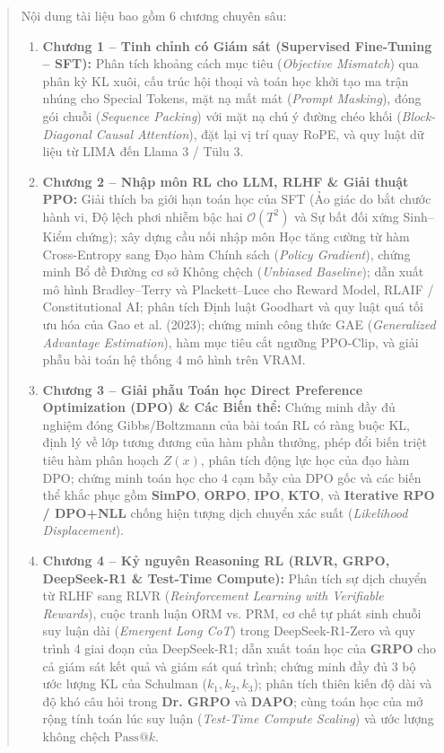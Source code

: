 \documentclass[11pt,a4paper,oneside]{report}
\theoremstyle{plain}
\theoremstyle{definition}
\theoremstyle{remark}
\begin{document}
\begin{abstract}
\vspace{0.3cm}
\noindent
Nội dung tài liệu bao gồm 6 chương chuyên sâu:
\begin{enumerate}[leftmargin=1.5cm]
    \item \textbf{Chương 1 -- Tinh chỉnh có Giám sát (Supervised Fine-Tuning -- SFT):} Phân tích khoảng cách mục tiêu (\textit{Objective Mismatch}) qua phân kỳ KL xuôi, cấu trúc hội thoại và toán học khởi tạo ma trận nhúng cho Special Tokens, mặt nạ mất mát (\textit{Prompt Masking}), đóng gói chuỗi (\textit{Sequence Packing}) với mặt nạ chú ý đường chéo khối (\textit{Block-Diagonal Causal Attention}), đặt lại vị trí quay RoPE, và quy luật dữ liệu từ LIMA đến Llama 3 / Tülu 3.
    \item \textbf{Chương 2 -- Nhập môn RL cho LLM, RLHF \& Giải thuật PPO:} Giải thích ba giới hạn toán học của SFT (Ảo giác do bắt chước hành vi, Độ lệch phơi nhiễm bậc hai $\mathcal{O}(T^2)$ và Sự bất đối xứng Sinh--Kiểm chứng); xây dựng cầu nối nhập môn Học tăng cường từ hàm Cross-Entropy sang Đạo hàm Chính sách (\textit{Policy Gradient}), chứng minh Bổ đề Đường cơ sở Không chệch (\textit{Unbiased Baseline}); dẫn xuất mô hình Bradley--Terry và Plackett--Luce cho Reward Model, RLAIF / Constitutional AI; phân tích Định luật Goodhart và quy luật quá tối ưu hóa của Gao et al. (2023); chứng minh công thức GAE (\textit{Generalized Advantage Estimation}), hàm mục tiêu cắt ngưỡng PPO-Clip, và giải phẫu bài toán hệ thống 4 mô hình trên VRAM.
    \item \textbf{Chương 3 -- Giải phẫu Toán học Direct Preference Optimization (DPO) \& Các Biến thể:} Chứng minh đầy đủ nghiệm đóng Gibbs/Boltzmann của bài toán RL có ràng buộc KL, định lý về lớp tương đương của hàm phần thưởng, phép đổi biến triệt tiêu hàm phân hoạch $Z(x)$, phân tích động lực học của đạo hàm DPO; chứng minh toán học cho 4 cạm bẫy của DPO gốc và các biến thể khắc phục gồm \textbf{SimPO}, \textbf{ORPO}, \textbf{IPO}, \textbf{KTO}, và \textbf{Iterative RPO / DPO+NLL} chống hiện tượng dịch chuyển xác suất (\textit{Likelihood Displacement}).
    \item \textbf{Chương 4 -- Kỷ nguyên Reasoning RL (RLVR, GRPO, DeepSeek-R1 \& Test-Time Compute):} Phân tích sự dịch chuyển từ RLHF sang RLVR (\textit{Reinforcement Learning with Verifiable Rewards}), cuộc tranh luận ORM vs. PRM, cơ chế tự phát sinh chuỗi suy luận dài (\textit{Emergent Long CoT}) trong DeepSeek-R1-Zero và quy trình 4 giai đoạn của DeepSeek-R1; dẫn xuất toán học của \textbf{GRPO} cho cả giám sát kết quả và giám sát quá trình; chứng minh đầy đủ 3 bộ ước lượng KL của Schulman ($k_1, k_2, k_3$); phân tích thiên kiến độ dài và độ khó câu hỏi trong \textbf{Dr. GRPO} và \textbf{DAPO}; cùng toán học của mở rộng tính toán lúc suy luận (\textit{Test-Time Compute Scaling}) và ước lượng không chệch $\text{Pass@}k$.

\end{enumerate}
\end{abstract}
\end{document}
